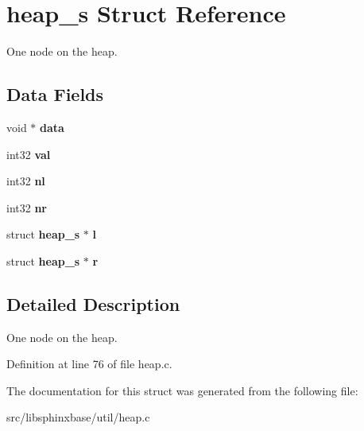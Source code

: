 \section{heap\_\-s Struct Reference}
\label{structheap__s}
One node on the heap.  


\subsection*{Data Fields}
\begin{CompactItemize}
\item 
void $\ast$ \textbf{data}\label{structheap__s_26600226471833b5b535f5603456b08c}

\item 
int32 \textbf{val}\label{structheap__s_2bf53cb7e38ef5c32fac4a1b1b1475df}

\item 
int32 \textbf{nl}\label{structheap__s_9b7935042dd6f8c404ec607e70e4f98c}

\item 
int32 \textbf{nr}\label{structheap__s_8194ad62437073a8758cd5222bf5cb9b}

\item 
struct {\bf heap\_\-s} $\ast$ \textbf{l}\label{structheap__s_27f089dc4bc2aad2bf7f8d6e9179f84a}

\item 
struct {\bf heap\_\-s} $\ast$ \textbf{r}\label{structheap__s_ed79bab0bdb297083c6f553515156270}

\end{CompactItemize}


\subsection{Detailed Description}
One node on the heap. 

Definition at line 76 of file heap.c.

The documentation for this struct was generated from the following file:\begin{CompactItemize}
\item 
src/libsphinxbase/util/heap.c\end{CompactItemize}
